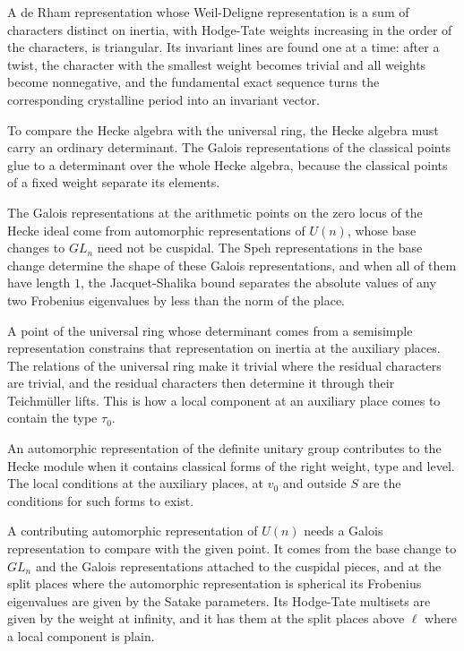 A de Rham representation whose Weil-Deligne representation is a sum of characters distinct on inertia, with Hodge-Tate weights increasing in the order of the characters, is triangular. Its invariant lines are found one at a time: after a twist, the character with the smallest weight becomes trivial and all weights become nonnegative, and the fundamental exact sequence turns the corresponding crystalline period into an invariant vector.

To compare the Hecke algebra with the universal ring, the Hecke algebra must carry an ordinary determinant. The Galois representations of the classical points glue to a determinant over the whole Hecke algebra, because the classical points of a fixed weight separate its elements.

The Galois representations at the arithmetic points on the zero locus of the Hecke ideal come from automorphic representations of $U(n)$, whose base changes to $GL_n$ need not be cuspidal. The Speh representations in the base change determine the shape of these Galois representations, and when all of them have length $1$, the Jacquet-Shalika bound separates the absolute values of any two Frobenius eigenvalues by less than the norm of the place.

A point of the universal ring whose determinant comes from a semisimple representation constrains that representation on inertia at the auxiliary places. The relations of the universal ring make it trivial where the residual characters are trivial, and the residual characters then determine it through their Teichm\"uller lifts. This is how a local component at an auxiliary place comes to contain the type $\tau_0$.

An automorphic representation of the definite unitary group contributes to the Hecke module when it contains classical forms of the right weight, type and level. The local conditions at the auxiliary places, at $v_0$ and outside $S$ are the conditions for such forms to exist.

A contributing automorphic representation of $U(n)$ needs a Galois representation to compare with the given point. It comes from the base change to $GL_n$ and the Galois representations attached to the cuspidal pieces, and at the split places where the automorphic representation is spherical its Frobenius eigenvalues are given by the Satake parameters. Its Hodge-Tate multisets are given by the weight at infinity, and it has them at the split places above $\ell$ where a local component is plain.

